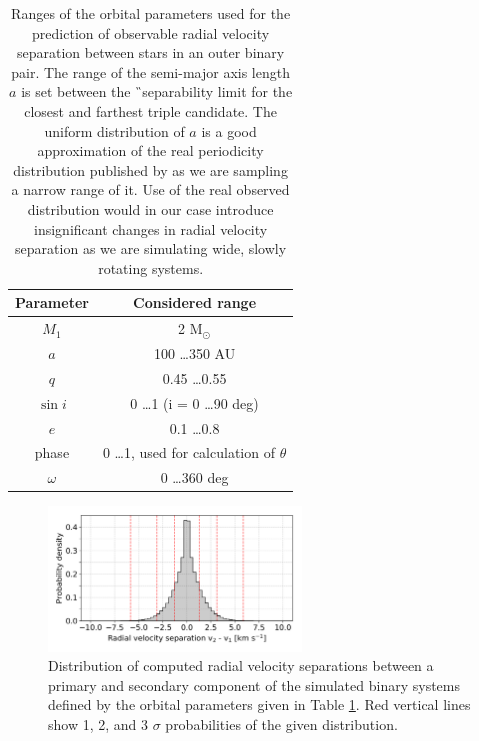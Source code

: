 \begin{table}
	\centering
	\caption{Ranges of the orbital parameters used for the prediction of observable radial velocity separation between stars in an outer binary pair. The range of the semi-major axis length $a$ is set between the \G\ separability limit for the closest and farthest triple candidate. The uniform distribution of $a$ is a good approximation of the real periodicity distribution published by \citet{2010ApJS..190....1R} as we are sampling a narrow range of it. Use of the real observed distribution would in our case introduce insignificant changes in radial velocity separation as we are simulating wide, slowly rotating systems.}
	\begin{tabular}{c c}
		\hline
		Parameter & Considered range \\ 
		\hline \hline
		$M_1$ & 2 M$_{\odot}$ \\
		$a$ & 100 \ldots 350 AU \\
		$q$ & 0.45 \ldots 0.55 \\
		$\sin i$ & 0 \ldots 1 (i = 0 \ldots 90 deg)\\
		$e$ & 0.1 \ldots 0.8 \\
		phase & 0 \ldots 1, used for calculation of $\theta$ \\
		$\omega$ & 0 \ldots 360 deg \\
		\hline
	\end{tabular}
	\label{tab:mc_gaia}
\end{table}

\begin{figure}
	\centering
	\includegraphics[width=0.6\textwidth]{MC_rv_from_sep_outer.png}
	\caption{Distribution of computed radial velocity separations between a primary and secondary component of the simulated binary systems defined by the orbital parameters given in Table \ref{tab:mc_gaia}. Red vertical lines show 1, 2, and 3 $\sigma$ probabilities of the given distribution.}
	\label{fig:mc_rv_sep}
\end{figure}

